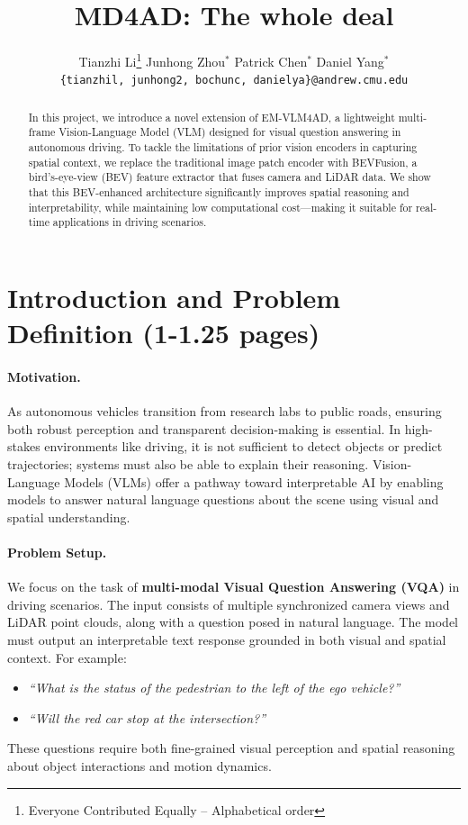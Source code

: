 \documentclass{article} %
\title{MD4AD: The whole deal}
\author{
  Tianzhi Li\thanks{\hspace{4pt}Everyone Contributed Equally -- Alphabetical order} \hspace{2em} Junhong Zhou$^*$ \hspace{2em} Patrick Chen$^*$ \hspace{2em} Daniel Yang$^*$ \\
  \texttt{\{tianzhil, junhong2, bochunc, danielya\}@andrew.cmu.edu}
  }
\date{}
\begin{document}
\maketitle

\begin{abstract}
In this project, we introduce a novel extension of EM-VLM4AD, a lightweight multi-frame Vision-Language Model (VLM) designed for visual question answering in autonomous driving. To tackle the limitations of prior vision encoders in capturing spatial context, we replace the traditional image patch encoder with BEVFusion, a bird's-eye-view (BEV) feature extractor that fuses camera and LiDAR data. We show that this BEV-enhanced architecture significantly improves spatial reasoning and interpretability, while maintaining low computational cost—making it suitable for real-time applications in driving scenarios.
\end{abstract}

\section{ Introduction and Problem Definition (1-1.25 pages)}
\paragraph{Motivation.}
As autonomous vehicles transition from research labs to public roads, ensuring both robust perception and transparent decision-making is essential. In high-stakes environments like driving, it is not sufficient to detect objects or predict trajectories; systems must also be able to explain their reasoning. Vision-Language Models (VLMs) offer a pathway toward interpretable AI by enabling models to answer natural language questions about the scene using visual and spatial understanding.

\paragraph{Problem Setup.}
We focus on the task of \textbf{multi-modal Visual Question Answering (VQA)} in driving scenarios. The input consists of multiple synchronized camera views and LiDAR point clouds, along with a question posed in natural language. The model must output an interpretable text response grounded in both visual and spatial context. For example:
\begin{itemize}
    \item \textit{“What is the status of the pedestrian to the left of the ego vehicle?”}
    \item \textit{“Will the red car stop at the intersection?”}
\end{itemize}
These questions require both fine-grained visual perception and spatial reasoning about object interactions and motion dynamics.
\end{document}
